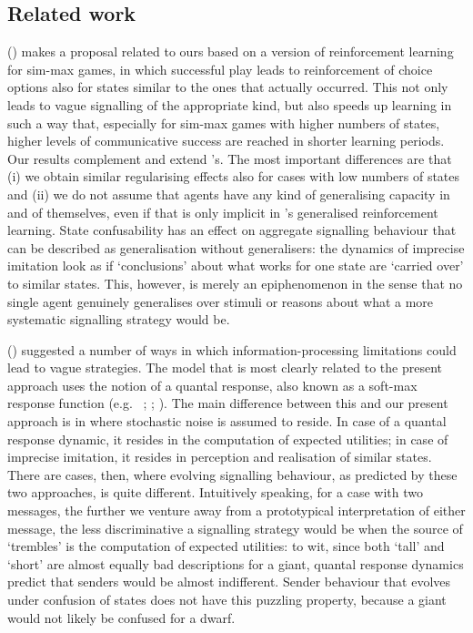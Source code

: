 \documentclass[11pt,english]{article}
\numberwithin{equation}{section}
\newcommand{\citetbjps}[1]{\citeauthor{#1} (\citeyear{#1})}
\newcommand{\citealtbjps}[1]{\citeauthor{#1} \citeyear{#1}}
\begin{document}
\subsection{Related work}
\citetbjps{OConnor2013:The-Evolution-o} makes a proposal related to ours based on a version of
reinforcement learning for sim-max games, in which successful play leads to reinforcement of
choice options also for states similar to the ones that actually occurred. This not only leads
to vague signalling of the appropriate kind, but also speeds up learning in such a way that,
especially for sim-max games with higher numbers of states, higher levels of communicative
success are reached in shorter learning periods. Our results complement and extend
\citeauthor{OConnor2013:The-Evolution-o}'s. The most important differences are that (i) we obtain
similar regularising effects also for cases with low numbers of states and (ii) we do not assume that
agents have any kind of generalising capacity in and of themselves, even if that is only
implicit in \citeauthor{OConnor2013:The-Evolution-o}'s generalised reinforcement learning.
State confusability has an effect on aggregate signalling behaviour that can be described as
generalisation without generalisers: the dynamics of imprecise imitation look as if
`conclusions' about what works for one state are `carried over' to similar states. This,
however, is merely an epiphenomenon in the sense that no single agent genuinely generalises
over stimuli or reasons about what a more systematic signalling strategy would be.


\citetbjps{FrankeJager2010:Vagueness-Signa} suggested a number of ways in which
in\-for\-ma\-tion-processing limitations could lead to vague strategies. The model that is most
clearly related to the present approach uses the notion of a quantal response, also
known as a soft-max response function
(e.g.~\citealtbjps{Luce1959:Individual-Choi}; \citealtbjps{McFadden1976:Quantal-Choice-}; \citealtbjps{GoereeHolt2008:Quantal-Respons}). The
main difference between this and our present approach is in where stochastic noise is assumed
to reside. In case of a quantal response dynamic, it resides in the computation of expected utilities;
in case of imprecise imitation, it resides in perception and realisation of similar states. There are
cases, then, where evolving signalling behaviour, as predicted by these two approaches, is quite
different. Intuitively speaking, for a case with two messages, the further we venture away from
a prototypical interpretation of either message, the less discriminative a signalling strategy
would be when the source of `trembles' is the computation of expected utilities: to wit,
since both `tall' and `short' are almost equally bad descriptions for a giant, quantal
response dynamics predict that senders would be almost indifferent. Sender behaviour that
evolves under confusion of states does not have this puzzling property, because a giant would
not likely be confused for a dwarf. 
\end{document}
